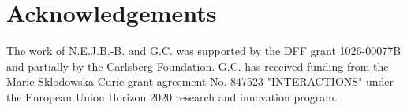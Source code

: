 \documentclass[a4paper,12pt]{article}
\begin{document}
\section{Acknowledgements}
The work of N.E.J.B.-B. and G.C. was supported by the DFF grant 1026-00077B and partially by the Carlsberg Foundation. G.C. has received funding from the Marie Sklodowska-Curie grant agreement No. 847523 "INTERACTIONS" under the European Union Horizon 2020 research and innovation program.





\end{document}
